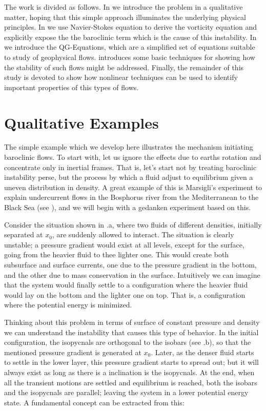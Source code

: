 The work is divided as follows. In  we introduce the
problem in a qualitative matter, hoping that this simple approach
illuminates the underlying physical principles. In 
we use Navier-Stokes equation to derive the vorticity equation and
explicitly expose the the baroclinic term which is the cause of this
instability.
In  we
introduce the QG-Equations, which are a simplified set of equations
suitable to study of geophysical flows.  
introduces some basic techniques for showing how the stability of such
flows might be addressed. Finally, the remainder of this study is devoted to
show how nonlinear techniques can be used to identify important
properties of this types of flows.

\section{Qualitative Examples}
\label{s:examples}

The simple example which we develop here illustrates the mechanism
initiating baroclinic flows. To start with, let us ignore the effects due
to earths rotation and concentrate only in inertial frames. That is,
let's start not by treating baroclinic instability perse, but the process
by which a fluid adjust to equilibrium given a uneven distribution in
density. A great example of this is Marsigli's experiment to explain
undercurrent flows in the Bosphorus river from the Mediterranean to the
Black Sea (see ), and we will begin with a gedanken
experiment based on this.

Consider the situation shown in .a, where two fluids
of different densities, initially separated at $x_0$, are suddenly
allowed to interact. The situation is clearly unstable; a pressure
gradient would exist at all levels, except for the surface, going from
the heavier fluid to thee lighter one. This would create both subsurface
and surface currents, one due to the pressure gradient in the bottom, and
the other due to mass conservation in the surface. Intuitively we can
imagine that the system would finally settle to a configuration where the
heavier fluid would lay on the bottom and the lighter one on top. That
is, a configuration where the potential energy is minimized.

Thinking about this problem in terms of surface of constant pressure and
density we can understand the instability that causes this type of
behavior. In the initial configuration, the isopycnals are orthogonal to
the isobars (see .b), so that the mentioned pressure
gradient is generated at $x_0$. Later, as the denser fluid starts to
settle in the lower layer, this pressure gradient starts to spread out;
but it will always exist as long as there is a inclination is the
isopycnals. At the end, when all the transient motions are settled and
equilibrium is reached, both  the isobars and the isopycnals are
parallel; leaving the system in a lower potential energy state. A
fundamental concept can be extracted from this:

